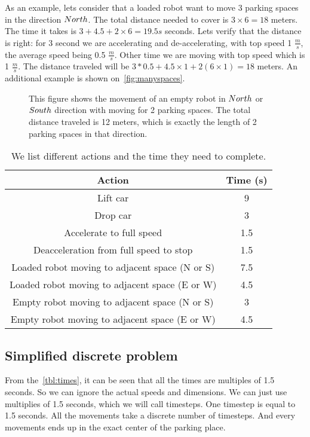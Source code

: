As an example, lets consider that a loaded robot want to move 3
parking spaces in the direction $North$. The total distance needed to cover is
$3\times 6 = 18$ meters. The time it takes is $3 + 4.5 + 2 \times 6 = 19.5s$
seconds. Lets verify that the distance is right: for 3 second we are
accelerating and de-accelerating, with top speed 1 $\frac{m}{s}$, the average
speed being 0.5 $\frac{m}{s}$. Other time we are moving with top speed which is 1
$\frac{m}{s}$. The distance traveled will be $3 * 0.5 + 4.5 \times 1 + 2(6
\times 1) = 18$ meters. An additional example is shown
on~\autoref{fig:manyspaces}.
\begin{figure}[h]
    \begin{center}
        
        \caption{This figure shows the movement of an empty robot in $North$ or
            $South$ direction with moving for 2 parking spaces. The total distance
            traveled is 12 meters, which is exactly the length of 2 parking spaces in
        that direction.}
        \label{fig:manyspaces}
    \end{center}
\end{figure}

\begin{table}
    \begin{center}
        \begin{tabular}{| c | c |}
            \hline
            Action & Time (s)\\
            \hline
            Lift car & 9\\
            Drop car & 3\\
            Accelerate to full speed & 1.5\\
            Deacceleration from full speed to stop & 1.5\\
            Loaded robot moving to adjacent space (N or S) & 7.5\\
            Loaded robot moving to adjacent space (E or W) & 4.5\\
            Empty robot moving to adjacent space (N or S) & 3\\
            Empty robot moving to adjacent space (E or W) & 4.5\\
            \hline
        \end{tabular}
        \caption{We list different actions and the time they need to complete.}
        \label{tbl:times}
    \end{center}
\end{table}
\subsection{Simplified discrete problem}
\label{sec:discrete problem}
From the~\autoref{tbl:times}, it can be seen that all the times are multiples
of 1.5 seconds. So we can ignore the actual speeds and dimensions. We can just
use multiplies of 1.5 seconds, which we will call timesteps. One timestep is
equal to 1.5 seconds. All the movements take a discrete number of timesteps.
And every movements ends up in the exact center of the parking place.

